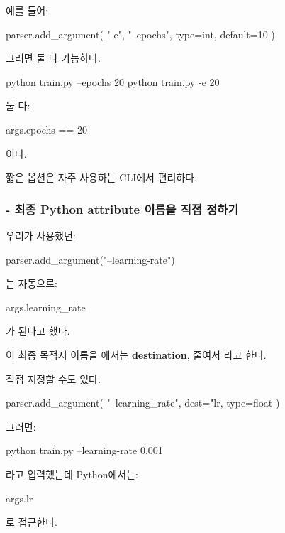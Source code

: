 예를 들어:

\begin{dhkcode}
parser.add_argument(
    "-e",
    "--epochs",
    type=int,
    default=10
)
\end{dhkcode}

그러면 둘 다 가능하다.

\begin{dhkzsh}
python train.py --epochs 20
python train.py -e 20
\end{dhkzsh}

둘 다:

\begin{dhkcode}
args.epochs == 20
\end{dhkcode}

이다.

짧은 옵션은 자주 사용하는 CLI에서 편리하다.

\subsubsection{ - 최종 Python attribute 이름을 직접 정하기}

우리가 사용했던:

\begin{dhkcode}
parser.add_argument("--learning-rate")
\end{dhkcode}

는 자동으로:

\begin{dhkcode}
args.learning_rate
\end{dhkcode}

가 된다고 했다.

이 최종 목적지 이름을 에서는 \textbf{destination}, 줄여서 라고 한다.

직접 지정할 수도 있다.

\begin{dhkcode}
parser.add_argument(
    "--learning_rate",
    dest="lr,
    type=float
)
\end{dhkcode}

그러면:

\begin{dhkzsh}
python train.py --learning-rate 0.001
\end{dhkzsh}

라고 입력했는데 Python에서는:

\begin{dhkcode}
args.lr
\end{dhkcode}

로 접근한다.

